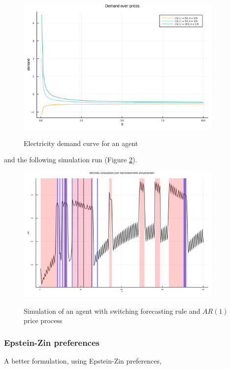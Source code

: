 \documentclass[american]{scrartcl}
\begin{document}
\begin{figure}[b]
    \caption{Electricity demand curve for an agent}
    \centering
    \includegraphics[width=0.9\textwidth]{../../plots/markets/pricedemand.png}
    \label{fig:demand}
\end{figure}

and the following simulation run (Figure \ref{fig:sim}).

\begin{figure}[b]
    \caption{Simulation of an agent with switching forecasting rule and $AR(1)$ price process}
    \centering
    \includegraphics[width=0.9\textwidth]{../../plots/markets/simul.png}
    \label{fig:sim}
\end{figure}

\subsubsection{Epstein-Zin preferences}

A better formulation, using Epstein-Zin preferences,
\end{document}
